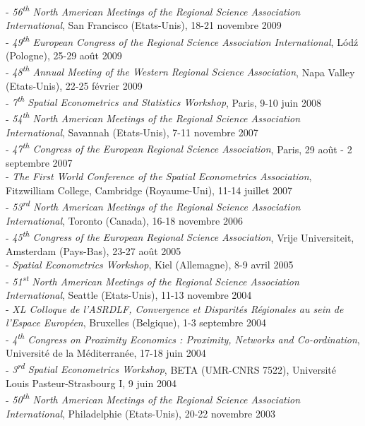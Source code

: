 \documentclass[a4paper,12pt]{article}
\begin{document}
- \textit{56\textsuperscript{th} North American Meetings of the Regional Science Association International}, San Francisco (Etats-Unis), 18-21 novembre 2009\\
- \textit{49\textsuperscript{th} European Congress of the Regional Science Association International}, Lód\'z (Pologne), 25-29 août 2009 \\
- \textit{48\textsuperscript{th} Annual Meeting of the Western Regional Science Association}, Napa Valley (Etats-Unis), 22-25 février 2009\\
- \textit{7\textsuperscript{th} Spatial Econometrics and Statistics Workshop}, Paris, 9-10 juin 2008\\
- \textit{54\textsuperscript{th} North American Meetings of the Regional Science Association International}, Savannah (Etats-Unis), 7-11 novembre 2007\\
- \textit{47\textsuperscript{th} Congress of the European Regional Science Association}, Paris, 29 août - 2 septembre 2007\\
- \textit{The First World Conference of the Spatial Econometrics Association}, Fitzwilliam College, Cambridge (Royaume-Uni), 11-14 juillet 2007\\
- \textit{53\textsuperscript{rd} North American Meetings of the Regional Science Association International}, Toronto (Canada), 16-18 novembre 2006\\
- \textit{45\textsuperscript{th} Congress of the European Regional Science Association}, Vrije Universiteit, Amsterdam (Pays-Bas), 23-27 août 2005\\
- \textit{Spatial Econometrics Workshop}, Kiel (Allemagne), 8-9 avril 2005\\
- \textit{51\textsuperscript{st} North American Meetings of the Regional Science Association International}, Seattle (Etats-Unis), 11-13 novembre 2004\\
- \textit{XL\ieme{} Colloque de l'ASRDLF, Convergence et Disparités Régionales au sein de l'Espace Européen}, Bruxelles (Belgique), 1-3 septembre 2004\\
- \textit{4\textsuperscript{th} Congress on Proximity Economics : Proximity, Networks and Co-ordination}, Université de la Méditerranée, 17-18 juin 2004\\
- \textit{3\textsuperscript{rd} Spatial Econometrics Workshop}, BETA (UMR-CNRS 7522), Université Louis Pasteur-Strasbourg I, 9 juin 2004\\
- \textit{50\textsuperscript{th} North American Meetings of the Regional Science Association International}, Philadelphie (Etats-Unis), 20-22 novembre 2003\\
\end{document}
